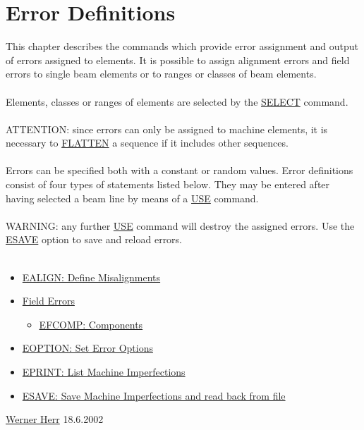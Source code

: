 


\section{Error Definitions}  This chapter describes the commands which provide error assignment and output of errors assigned to elements. It is possible to assign alignment errors and field errors to single beam elements or to ranges or classes of beam elements. 
\\
\\ Elements, classes or ranges of elements are selected by the \href{../Introduction/select.html}{SELECT} command. 
\\
\\ ATTENTION: since errors can only be assigned to machine elements, it is necessary to  \href{../control/seqedit.html#flatten}{FLATTEN} a sequence if it includes other sequences. 
\\
\\ Errors can be specified both with a constant or random values. Error definitions consist of four types of statements listed below. They may be entered after having selected a beam line by means of a \href{../control/general.html#use}{USE} command. 
\\
\\ WARNING: any further \href{../control/general.html#use}{USE} command will destroy the assigned errors. Use the \href{../error/error_save.html}{ESAVE} option to save and reload errors. 
\\
\\
\begin{itemize}
	\item \href{error_align.html}{EALIGN: Define Misalignments}
	\item \href{error_field.html}{Field Errors}
\begin{itemize}
	\item \href{error_field.html#efcomp}{EFCOMP: Components}
\end{itemize}
	\item \href{error_option.html}{EOPTION: Set Error Options}
	\item \href{error_print.html}{EPRINT: List Machine Imperfections}
	\item \href{error_save.html}{ESAVE: Save Machine Imperfections and read back from file}
\end{itemize}\href{http://consult.cern.ch/xwho/people/1808}{Werner Herr} 18.6.2002 









